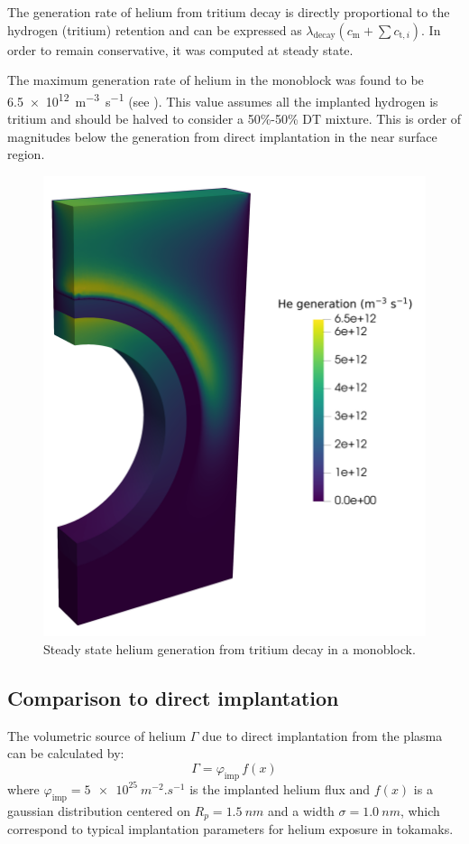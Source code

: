 The generation rate of helium from tritium decay is directly proportional to the hydrogen (tritium) retention and can be expressed as $\lambda_\mathrm{decay} (c_\mathrm{m} + \sum c_{\mathrm{t}, i})$.
In order to remain conservative, it was computed at steady state.

The maximum generation rate of helium in the \gls{monoblock} was found to be \SI{6.5e12}{m^{-3}.s^{-1}} (see ).
This value assumes all the implanted hydrogen is tritium and should be halved to consider a 50\%-50\% DT mixture.
This is order of magnitudes below the generation from direct implantation in the near surface region.

\begin{figure}
    \centering
    \includegraphics[width=0.5\linewidth]{Figures/Chapter5/he_generation_decay.png}
    \caption{Steady state helium generation from tritium decay in a monoblock.}
\end{figure}

\subsection{Comparison to direct implantation}

The volumetric source of helium $\Gamma$ due to direct implantation from the plasma can be calculated by:
\begin{equation}
    \Gamma = \varphi_\mathrm{imp} \, f(x)
\end{equation}
where $\varphi_\mathrm{imp} = \SI{5e25}{m^{-2}.s^{-1}}$ is the implanted helium flux and $f(x)$ is a gaussian distribution centered on $R_p=\SI{1.5}{nm}$ and a width $\sigma=\SI{1.0}{nm}$, which correspond to typical implantation parameters for helium exposure in tokamaks.

